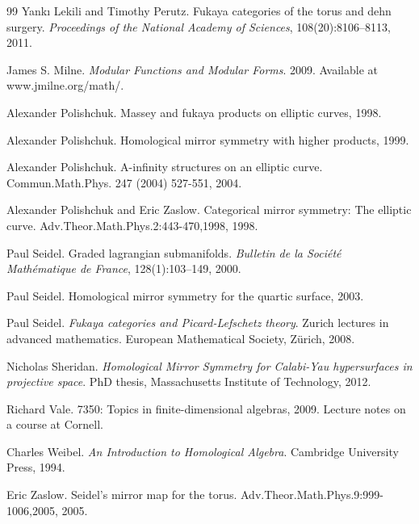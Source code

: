 \begin{thebibliography}{99}
 Yank{\i} Lekili and Timothy Perutz. Fukaya categories of the torus and dehn surgery. \emph{Proceedings of the National Academy of Sciences}, 108(20):8106--8113, 2011.

 James S. Milne. \emph{Modular Functions and Modular Forms}. 2009. Available at www.jmilne.org/math/.

 Alexander Polishchuk. Massey and fukaya products on elliptic curves, 1998.

 Alexander Polishchuk. Homological mirror symmetry with higher products, 1999.

 Alexander Polishchuk. A-infinity structures on an elliptic curve. Commun.Math.Phys. 247 (2004) 527-551, 2004.

 Alexander Polishchuk and Eric Zaslow. Categorical mirror symmetry: The elliptic curve. Adv.Theor.Math.Phys.2:443-470,1998, 1998.

 Paul Seidel. Graded lagrangian submanifolds. \emph{Bulletin de la Soci\'et\'e Math\'ematique de France}, 128(1):103--149, 2000.

 Paul Seidel. Homological mirror symmetry for the quartic surface, 2003.

 Paul Seidel. \emph{Fukaya categories and Picard-Lefschetz theory}. Zurich lectures in advanced mathematics. European Mathematical Society, Z\"urich, 2008.

 Nicholas Sheridan. \emph{Homological Mirror Symmetry for Calabi-Yau hypersurfaces in projective space}. PhD thesis, Massachusetts Institute of Technology, 2012.

 Richard Vale. 7350: Topics in finite-dimensional algebras, 2009. Lecture notes on a course at Cornell.

 Charles Weibel. \emph{An Introduction to Homological Algebra}. Cambridge University Press, 1994.

 Eric Zaslow. Seidel's mirror map for the torus. Adv.Theor.Math.Phys.9:999-1006,2005, 2005.

\end{thebibliography}
